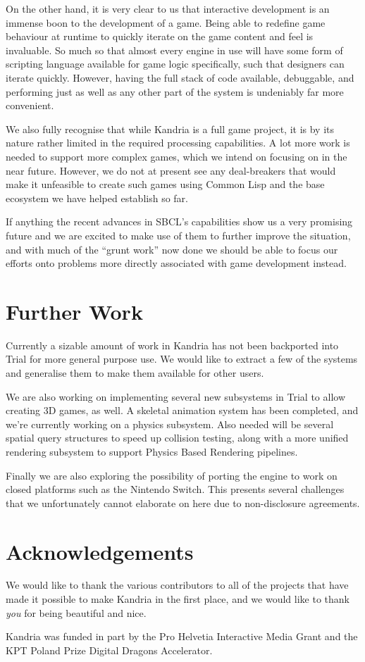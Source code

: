 \documentclass[format=sigconf]{acmart}
\begin{document}
On the other hand, it is very clear to us that interactive development is an immense boon to the development of a game. Being able to redefine game behaviour at runtime to quickly iterate on the game content and feel is invaluable. So much so that almost every engine in use will have some form of scripting language available for game logic specifically, such that designers can iterate quickly. However, having the full stack of code available, debuggable, and performing just as well as any other part of the system is undeniably far more convenient.

We also fully recognise that while Kandria is a full game project, it is by its nature rather limited in the required processing capabilities. A lot more work is needed to support more complex games, which we intend on focusing on in the near future. However, we do not at present see any deal-breakers that would make it unfeasible to create such games using Common Lisp and the base ecosystem we have helped establish so far.

If anything the recent advances in SBCL's capabilities show us a very promising future and we are excited to make use of them to further improve the situation, and with much of the ``grunt work'' now done we should be able to focus our efforts onto problems more directly associated with game development instead.

\section{Further Work}\label{further-work}
Currently a sizable amount of work in Kandria has not been backported into Trial for more general purpose use. We would like to extract a few of the systems and generalise them to make them available for other users.

We are also working on implementing several new subsystems in Trial to allow creating 3D games, as well. A skeletal animation system has been completed, and we're currently working on a physics subsystem. Also needed will be several spatial query structures to speed up collision testing, along with a more unified rendering subsystem to support Physics Based Rendering pipelines.

Finally we are also exploring the possibility of porting the engine to work on closed platforms such as the Nintendo Switch. This presents several challenges that we unfortunately cannot elaborate on here due to non-disclosure agreements.

\section{Acknowledgements}\label{acknowledgements}
We would like to thank the various contributors to all of the projects that have made it possible to make Kandria in the first place, and we would like to thank \textit{you} for being beautiful and nice.

Kandria was funded in part by the Pro Helvetia Interactive Media Grant and the KPT Poland Prize Digital Dragons Accelerator.

\end{document}
